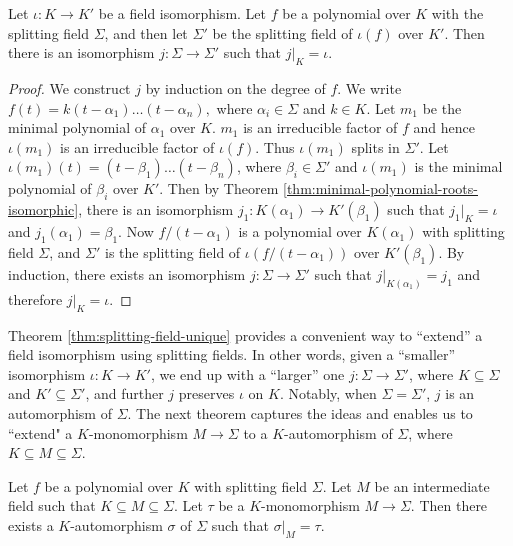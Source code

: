 \begin{theorem} \label{thm:splitting-field-unique}
	Let $\iota: K \to K'$ be a field isomorphism. Let $f$ be a polynomial over $K$ with the splitting field $\Sigma$, and then let $\Sigma'$ be the splitting field of $\iota(f)$ over $K'$. Then there is an isomorphism $j : \Sigma \to \Sigma'$ such that $j | _K = \iota$. 
\end{theorem}

\begin{proof}
	We construct $j$ by induction on the degree of $f$. We write $ f(t) = k (t - \alpha_1) \ldots (t - \alpha_n), $ where $\alpha_i \in \Sigma$ and $k \in K$. Let $m_1$ be the minimal polynomial of $\alpha_1$ over $K$. $m_1$ is an irreducible factor of $f$ and hence $\iota(m_1)$ is an irreducible factor of $\iota(f)$. Thus $\iota(m_1)$ splits in $\Sigma'$. Let $\iota(m_1)(t) = (t - \beta_1) \ldots (t - \beta_n)$, where $\beta_i \in \Sigma'$ and $\iota(m_1)$ is the minimal polynomial of $\beta_i$ over $K'$. Then by Theorem \ref{thm:minimal-polynomial-roots-isomorphic}, there is an isomorphism $j_1 : K(\alpha_1) \to K'(\beta_1)$ such that $j_1 | _K = \iota$ and $j_1(\alpha_1) = \beta_1$. Now $f / (t - \alpha_1)$ is a polynomial over $K(\alpha_1)$ with splitting field $\Sigma$, and $\Sigma'$ is the splitting field of $\iota(f / (t - \alpha_1))$ over $K'(\beta_1)$. By induction, there exists an isomorphism $j: \Sigma \to \Sigma'$ such that $j | _{K(\alpha_1)} = j_1$ and therefore $j | _K = \iota$. 
\end{proof}



Theorem \ref{thm:splitting-field-unique} provides a convenient way to ``extend'' a field isomorphism using splitting fields. In other words, given a ``smaller'' isomorphism $\iota: K \to K'$, we end up with a ``larger'' one $j: \Sigma \to \Sigma'$, where $K \subseteq \Sigma$ and $K' \subseteq \Sigma'$, and further $j$ preserves $\iota$ on $K$. Notably, when $\Sigma  = \Sigma'$, $j$ is an automorphism of $\Sigma$. The next theorem captures the ideas and enables us to ``extend" a $K$-monomorphism $M \to \Sigma$ to a $K$-automorphism of $\Sigma$, where $K \subseteq M \subseteq \Sigma$. 

\begin{theorem} \label{thm:monomorphism-extend-automorphism}
	Let $f$ be a polynomial over $K$ with splitting field $\Sigma$. Let $M$ be an intermediate field such that $K \subseteq M \subseteq \Sigma$. Let $\tau$ be a $K$-monomorphism $M \to \Sigma$. Then there exists a $K$-automorphism $\sigma$ of $\Sigma$ such that $\sigma | _M = \tau$.  
\end{theorem}


